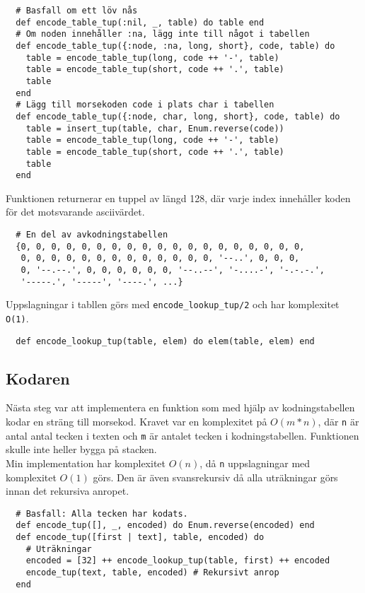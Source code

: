 \documentclass[a4paper,11pt]{article}
\begin{document}
\begin{verbatim}
  # Basfall om ett löv nås
  def encode_table_tup(:nil, _, table) do table end
  # Om noden innehåller :na, lägg inte till något i tabellen
  def encode_table_tup({:node, :na, long, short}, code, table) do
    table = encode_table_tup(long, code ++ '-', table)
    table = encode_table_tup(short, code ++ '.', table)
    table
  end
  # Lägg till morsekoden code i plats char i tabellen
  def encode_table_tup({:node, char, long, short}, code, table) do
    table = insert_tup(table, char, Enum.reverse(code))
    table = encode_table_tup(long, code ++ '-', table)
    table = encode_table_tup(short, code ++ '.', table)    
    table
  end
\end{verbatim}

Funktionen returnerar en tuppel av längd 128, där varje index innehåller koden för det motsvarande asciivärdet.

\begin{verbatim}
  # En del av avkodningstabellen
  {0, 0, 0, 0, 0, 0, 0, 0, 0, 0, 0, 0, 0, 0, 0, 0, 0, 0, 0,
   0, 0, 0, 0, 0, 0, 0, 0, 0, 0, 0, 0, 0, '--..', 0, 0, 0,
   0, '--.--.', 0, 0, 0, 0, 0, 0, '--..--', '-....-', '-.-.-.',
   '-----.', '-----', '----.', ...}
\end{verbatim}

Uppslagningar i tabllen görs med \texttt{encode_lookup_tup/2} och har komplexitet {\tt O(1)}.

\begin{verbatim}
  def encode_lookup_tup(table, elem) do elem(table, elem) end
\end{verbatim}

\subsection*{Kodaren}
Nästa steg var att implementera en funktion som med hjälp av kodningstabellen kodar en sträng till morsekod. Kravet var en komplexitet på \(O(m*n)\), där {\tt n} är antal antal tecken i texten och {\tt m} är antalet tecken i kodningstabellen. Funktionen skulle inte heller bygga på stacken.\\

Min implementation har komplexitet \(O(n)\), då {\tt n} uppslagningar med komplexitet \(O(1)\) görs. Den är även svansrekursiv då alla uträkningar görs innan det rekursiva anropet.

\newpage
\begin{verbatim}
  # Basfall: Alla tecken har kodats. 
  def encode_tup([], _, encoded) do Enum.reverse(encoded) end
  def encode_tup([first | text], table, encoded) do
    # Uträkningar
    encoded = [32] ++ encode_lookup_tup(table, first) ++ encoded
    encode_tup(text, table, encoded) # Rekursivt anrop
  end
\end{verbatim}
\end{document}
